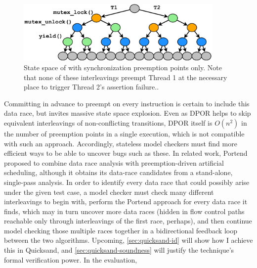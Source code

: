 {\begin{figure}[ht!] %
	\begin{center}
		\includegraphics[width=0.9\textwidth]{../oopsla/tree-maximal-only.pdf}
	\end{center}
	\caption[State space of  with synchronization preemption points only.]
	{State space of  with synchronization preemption points only.
	Note that none of these interleavings preempt Thread 1 at the necessary place
	to trigger Thread 2's assertion failure..}
	\label{fig:pps-statespace}
\end{figure}
}

Committing in advance to
preempt on every instruction is certain to include this data race,
but invites massive state space explosion.
Even as DPOR helps to skip equivalent interleavings of non-conflicting transitions,
DPOR itself is $O(n^2)$ in the number of preemption points in a single execution,
which is not compatible with such an approach.
Accordingly, stateless model checkers must find more efficient ways to be able to uncover bugs such as these.
%
In related work,
Portend~\cite{portend} proposed to combine data race analysis with preemption-driven artificial scheduling,
although it obtains its data-race candidates from a stand-alone, single-pass analysis.
In order to
identify every
data race that could possibly arise under the given test case,
a model checker must check many different interleavings to begin with,
perform the Portend approach for every data race it finds,
which may in turn uncover more data races
(hidden in flow control paths reachable only through interleavings of the first race, perhaps),
and then continue model checking those multiple races together
in a
bidirectional feedback loop between the two algorithms.
Upcoming,
\cref{sec:quicksand-id} will show how I achieve this in Quicksand, and
\cref{sec:quicksand-soundness} will justify the technique's formal verification power.
In the evaluation, %

